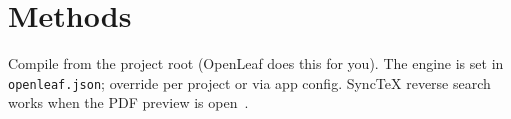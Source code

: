 \section{Methods}
\label{sec:methods}

Compile from the project root (OpenLeaf does this for you). The engine is set in
\texttt{openleaf.json}; override per project or via app config. SyncTeX reverse
search works when the PDF preview is open~\cite{openleaf2026}.
